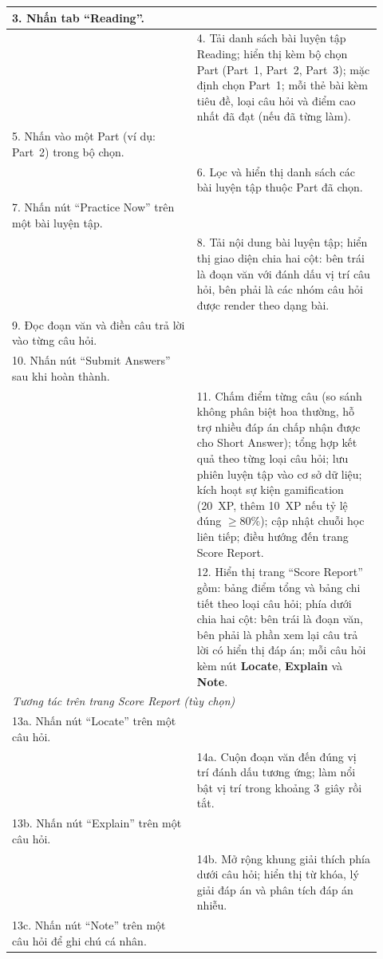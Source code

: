 \begin{longtable}{|p{0.46\linewidth}|p{0.46\linewidth}|}
    3. Nhấn tab ``Reading''. & \\ \hline
    & 4. Tải danh sách bài luyện tập Reading; hiển thị kèm bộ chọn Part (Part~1, Part~2, Part~3); mặc định chọn Part~1; mỗi thẻ bài kèm tiêu đề, loại câu hỏi và điểm cao nhất đã đạt (nếu đã từng làm). \\ \hline
    5. Nhấn vào một Part (ví dụ: Part~2) trong bộ chọn. & \\ \hline
    & 6. Lọc và hiển thị danh sách các bài luyện tập thuộc Part đã chọn. \\ \hline
    7. Nhấn nút ``Practice Now'' trên một bài luyện tập. & \\ \hline
    & 8. Tải nội dung bài luyện tập; hiển thị giao diện chia hai cột: bên trái là đoạn văn với đánh dấu vị trí câu hỏi, bên phải là các nhóm câu hỏi được render theo dạng bài. \\ \hline
    9. Đọc đoạn văn và điền câu trả lời vào từng câu hỏi. & \\ \hline
    10. Nhấn nút ``Submit Answers'' sau khi hoàn thành. & \\ \hline
    & 11. Chấm điểm từng câu (so sánh không phân biệt hoa thường, hỗ trợ nhiều đáp án chấp nhận được cho Short Answer); tổng hợp kết quả theo từng loại câu hỏi; lưu phiên luyện tập vào cơ sở dữ liệu; kích hoạt sự kiện gamification (20~XP, thêm 10~XP nếu tỷ lệ đúng $\geq 80\%$); cập nhật chuỗi học liên tiếp; điều hướng đến trang Score Report. \\ \hline
    & 12. Hiển thị trang ``Score Report'' gồm: bảng điểm tổng và bảng chi tiết theo loại câu hỏi; phía dưới chia hai cột: bên trái là đoạn văn, bên phải là phần xem lại câu trả lời có hiển thị đáp án; mỗi câu hỏi kèm nút \textbf{Locate}, \textbf{Explain} và \textbf{Note}. \\ \hline
    \multicolumn{2}{|l|}{\textit{Tương tác trên trang Score Report (tùy chọn)}} \\ \hline
    13a. Nhấn nút ``Locate'' trên một câu hỏi. & \\ \hline
    & 14a. Cuộn đoạn văn đến đúng vị trí đánh dấu tương ứng; làm nổi bật vị trí trong khoảng 3~giây rồi tắt. \\ \hline
    13b. Nhấn nút ``Explain'' trên một câu hỏi. & \\ \hline
    & 14b. Mở rộng khung giải thích phía dưới câu hỏi; hiển thị từ khóa, lý giải đáp án và phân tích đáp án nhiễu. \\ \hline
    13c. Nhấn nút ``Note'' trên một câu hỏi để ghi chú cá nhân. & \\ \hline

\end{longtable}

